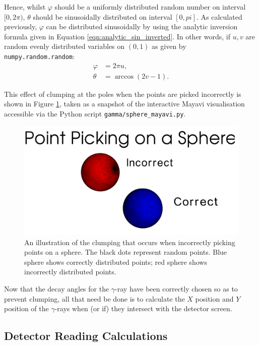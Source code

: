 Hence, whilst $\varphi$ should be a uniformly distributed random number on interval $[0, 2\pi)$, $\theta$ should be sinusoidally distributed on interval $[0, pi]$. As calculated previously, $\varphi$ can be distributed sinusoidally by using the analytic inversion formula given in Equation \ref{eqn:analytic_sin_inverted}. In other words, if $u, v$ are random evenly distributed variables on $(0,1)$ as given by \texttt{numpy.random.random}:
\begin{align}
    \varphi &= 2\pi u, \\
    \theta  &= \arccos(2v - 1).
\end{align}

This effect of clumping at the poles when the points are picked incorrectly is shown in Figure \ref{fig:spheres}, taken as a snapshot of the interactive Mayavi visualisation accessible via the Python script \texttt{gamma/sphere\_mayavi.py}.

\begin{figure}
    \centering
    \includegraphics[width=\linewidth]{graphs/gamma/spheres}
    \caption{An illustration of the clumping that occurs when incorrectly picking points on a sphere. The black dots represent random points. Blue sphere shows correctly distributed points; red sphere shows incorrectly distributed points.}
    \label{fig:spheres}
\end{figure}

Now that the decay angles for the $\gamma$-ray have been correctly chosen so as to prevent clumping, all that need be done is to calculate the $X$ position and $Y$ position of the $\gamma$-rays when (or if) they intersect with the detector screen.

\subsection{Detector Reading Calculations}
\label{subsec:detector_reading_calculations}

